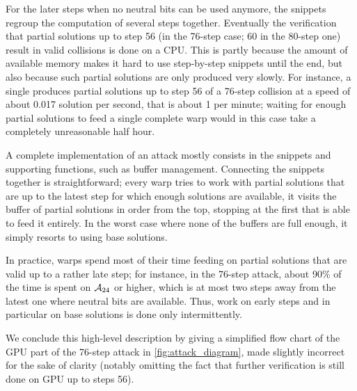 For the
later steps when no neutral bits can be used anymore, the snippets regroup the computation of several steps together.
Eventually the verification that partial solutions up to step 56 (in the 76-step case; 60 in the 80-step one) result in valid collisions is done on a CPU. This is partly because
the amount of available memory makes it hard to use step-by-step snippets until the end, but also because such partial solutions are only
produced very slowly. For instance, a single \gtx produces partial solutions up to step 56 of a 76-step collision at a speed of about 0.017 solution per second, that is about
1 per minute; waiting for enough partial solutions to feed a single complete warp would in this case take a completely unreasonable half hour.

\bigskip


A complete implementation of an attack mostly consists in the snippets and supporting functions, such as buffer management.
Connecting the snippets together is straightforward; every warp tries to work with partial solutions that are up
to the latest step for which enough solutions are available, \ie it visits the buffer of partial solutions in order from the top,
stopping at the first that is able to feed it entirely.
In the worst case where none of the buffers are full enough, it simply resorts to using base solutions.

In practice, warps spend most of their time feeding on partial solutions that are valid up to a rather late step; for instance, in the 76-step attack,
about 90\% of the time is spent on $\mathcal{A}_{24}$ or higher, which is at most two steps away from the latest one where neutral bits are available.
Thus, work on early steps and in particular on base solutions is done only intermittently.

We conclude this high-level description by giving a simplified flow chart
of the GPU part of the 76-step attack in \autoref{fig:attack_diagram}, made slightly incorrect for the sake of clarity (notably omitting the fact that further verification is still done on GPU up to steps 56).

\def\rectanMac{\begin{tikzpicture}[scale=0.2]\draw (0,0) rectangle (1,1);\end{tikzpicture}}
\def\elliMac{\begin{tikzpicture}[scale=0.3,transform shape]\node[draw,ellipse] (e) at (0,0) {\phantom{toto}};\end{tikzpicture}}
\def\plainMac{\begin{tikzpicture}[scale=0.1] \draw[>=latex,->] (0,0) -- (2,2);\end{tikzpicture}}
\def\dottMac{\begin{tikzpicture}[scale=0.1] \draw[dotted,->]   (0,0) -- (2,2);\end{tikzpicture}}

